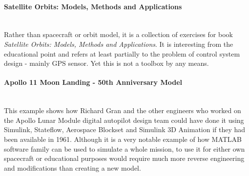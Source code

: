         \paragraph*{Satellite Orbits: Models, Methods and Applications}\hspace{0pt}\\
            Rather than spacecraft or orbit model, it is a collection of exercises for book \textit{Satellite Orbits: Models, Methods and Applications}. It is interesting from the educational point and refers at least partially to the problem of control system design - mainly GPS sensor. Yet this is not a toolbox by any means.
        
        \paragraph*{Apollo 11 Moon Landing - 50th Anniversary Model}\hspace{0pt}\\
            This example shows how Richard Gran and the other engineers who worked on the Apollo Lunar Module digital autopilot design team could have done it using Simulink, Stateflow, Aerospace Blockset and Simulink 3D Animation if they had been available in 1961. Although it is a very notable example of how MATLAB software family can be used to simulate a whole mission, to use it for either own spacecraft or educational purposes would require much more reverse engineering and modifications than creating a new model. 

